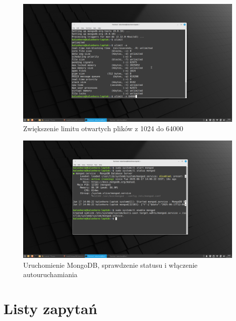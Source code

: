 \documentclass[11pt]{article}
\begin{document}
\newpage
		\begin{figure}[!ht]
			\includegraphics[width=\textwidth]{7_zmiana_ustawien_dotyczacych_plikow.png}
			\caption{Zwiększenie limitu otwartych plików z 1024 do 64000}
		\end{figure}
		\begin{figure}[!ht]
			\includegraphics[width=\textwidth]{8_uruchomienie_sprawdzenie_i_aktywacja_autouruchamiania_mongodb.png}
			\caption{Uruchomienie MongoDB, sprawdzenie statusu i włączenie autouruchamiania}
		\end{figure}

\newpage
\section{Listy zapytań}
\end{document}
